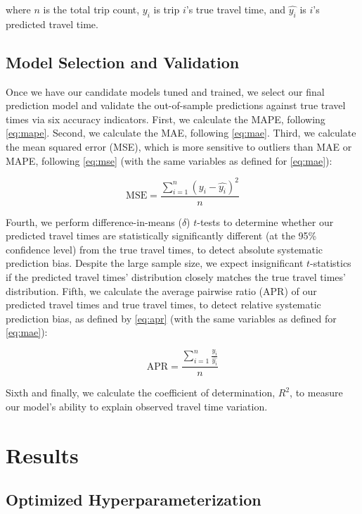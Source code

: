 \documentclass[12pt,letterpaper]{article} %
\begin{document}
where $n$ is the total trip count, $y_i$ is trip $i$'s true travel time, and $\hat{y_i}$ is $i$'s predicted travel time.

\subsection{Model Selection and Validation}

Once we have our candidate models tuned and trained, we select our final prediction model and validate the out-of-sample predictions against true travel times via six accuracy indicators. First, we calculate the MAPE, following \autoref{eq:mape}. Second, we calculate the MAE, following \autoref{eq:mae}. Third, we calculate the mean squared error (MSE), which is more sensitive to outliers than MAE or MAPE, following \autoref{eq:mse} (with the same variables as defined for \autoref{eq:mae}):

\begin{equation}
\label{eq:mse}
\text{MSE} = \frac{\sum^{n}_{i=1} (y_i - \hat{y_i})^2}{n}
\end{equation}

Fourth, we perform difference-in-means ($\delta$) $t$-tests to determine whether our predicted travel times are statistically significantly different (at the 95\% confidence level) from the true travel times, to detect absolute systematic prediction bias. Despite the large sample size, we expect insignificant $t$-statistics if the predicted travel times' distribution closely matches the true travel times' distribution. Fifth, we calculate the average pairwise ratio (APR) of our predicted travel times and true travel times, to detect relative systematic prediction bias, as defined by \autoref{eq:apr} (with the same variables as defined for \autoref{eq:mae}):

\begin{equation}
\label{eq:apr}
\text{APR} = \frac{\sum^{n}_{i=1}\frac{y_i}{\hat{y_i}}}{n}
\end{equation}

Sixth and finally, we calculate the coefficient of determination, $R^2$, to measure our model's ability to explain observed travel time variation.

\section{Results}

\subsection{Optimized Hyperparameterization}
\end{document}
